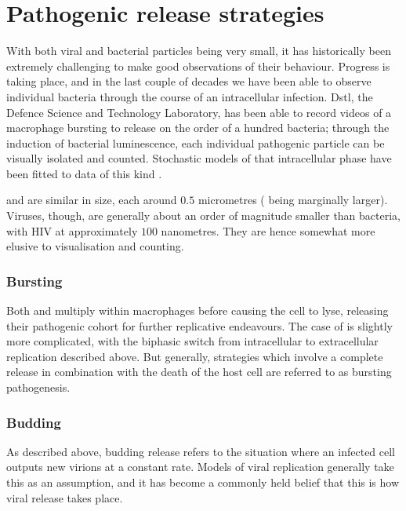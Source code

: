 \section{Pathogenic release strategies}

With both viral and bacterial particles being very small, it has historically
been extremely challenging to make good observations of their behaviour.
Progress is taking place, and in the last couple of decades we have been able
to observe individual bacteria through the course of an intracellular
infection. Dstl, the Defence Science and Technology Laboratory, has been able
to record videos of a macrophage bursting to release on the order of a hundred
\ft{} bacteria; through the induction of bacterial luminescence, each
individual pathogenic particle can be visually isolated and counted. Stochastic
models of that intracellular phase have been fitted to data of this kind
\cite{carruthers2020stochastic}.

\ft{} and \yp{} are similar in size, each around $0.5$ micrometres (\yp{} being
marginally larger). Viruses, though, are generally about an order of magnitude
smaller than bacteria, with HIV at approximately $100$ nanometres. They are
hence somewhat more elusive to visualisation and counting.

\subsubsection*{Bursting}

Both \ft{} and \yp{} multiply within macrophages before causing the cell to
lyse, releasing their pathogenic cohort for further replicative endeavours. The
case of \yp{} is slightly more complicated, with the biphasic switch from
intracellular to extracellular replication described above. But generally,
strategies which involve a complete release in combination with the death of
the host cell are referred to as bursting pathogenesis.

\subsubsection*{Budding}

As described above, budding release refers to the situation where an infected
cell outputs new virions at a constant rate. Models of viral replication
generally take this as an assumption, and it has become a commonly held belief
that this is how viral release takes place.

